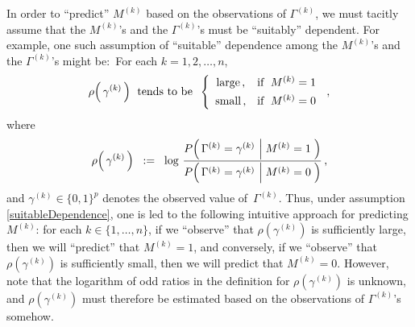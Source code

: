\vskip 0.5cm
\begin{remark}
\mbox{}\vskip 0.05cm
\noindent
In order to ``predict'' $M^{(k)}$ based on the observations of $\Gamma^{(k)}$,
we must tacitly assume that the $M^{(k)}$'s and the $\Gamma^{(k)}$'s must be
``suitably'' dependent.
For example, one such assumption of ``suitable'' dependence among
the $M^{(k)}$'s and the $\Gamma^{(k)}$'s might be:\,
For each $k = 1,2,\ldots,n$,
\begin{equation}\label{suitableDependence}
\rho\!\left(\,\gamma^{(k)}\,\right) \;\,\textnormal{tends to be}
\;\;
\left\{\begin{array}{cl}
\textnormal{large}\,, & \textnormal{if \;$M^{(k)} = 1$}
\\
\textnormal{small}\,, & \textnormal{if \;$\overset{{\color{white}.}}{M^{(k)}} = 0$}
\end{array}\right.\,,
\end{equation}
where
\begin{equation*}
\rho\!\left(\,\gamma^{(k)}\,\right)
\;\; := \;\;
\log\,
\dfrac{P\!\left(\,\Gamma^{(k)}=\gamma^{(k)}\,\left\vert\;M^{(k)} = \overset{{\color{white}.}}{1}\,\right.\right)}
{P\!\left(\,\Gamma^{(k)}=\gamma^{(k)}\,\left\vert\;M^{(k)} = \overset{{\color{white}.}}{0}\right.\,\right)}\,,
\end{equation*}
and $\gamma^{(k)} \in \{0,1\}^{p}$ denotes the observed value of \,$\Gamma^{(k)}$.
Thus, under assumption \eqref{suitableDependence},
one is led to the following intuitive approach for predicting $M^{(k)}$:
for each $k\in\{1,\ldots,n\}$,
if we ``observe'' that $\rho(\gamma^{(k)})$ is sufficiently large, then we will ``predict'' that $M^{(k)} = 1$,
and conversely,
if we ``observe'' that $\rho(\gamma^{(k)})$ is sufficiently small, then we will predict that $M^{(k)} = 0$.
However, note that
{\color{red}the logarithm of odd ratios in the definition for $\rho(\gamma^{(k)})$ is unknown},
and $\rho(\gamma^{(k)})$ must therefore be estimated based on the observations of $\Gamma^{(k)}$'s somehow.

\end{remark}
